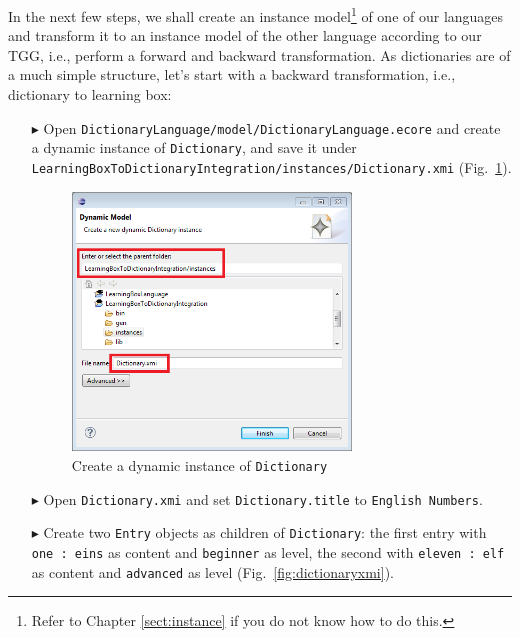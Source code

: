In the next few steps, we shall create an instance model\footnote{Refer to Chapter \ref{sect:instance} if you do not know how to do this.} of one of our languages and  transform it to an instance model of the other language according to our TGG, i.e., perform a forward and backward transformation.
As dictionaries are of a much simple structure, let's start with a backward transformation, i.e., dictionary to learning box:

\begin{enumerate}
\item[$\blacktriangleright$] Open \texttt{Dictionary\-Language/model/Dictionary\-Language.ecore} and create a dynamic instance of \texttt{Dictionary}, and save it under \texttt{Learn\-ing\-Box\-To\-Dictionary\-In\-te\-gra\-tion/in\-stan\-ces/Dic\-tion\-ary.xmi} (Fig.~\ref{fig:create_instance_dict}).

\begin{figure}[htbp]
\begin{center}
  \includegraphics[width=0.7\textwidth]{pics/tggBilder/transformation/tgg24}
  \caption{Create a dynamic instance of \texttt{Dictionary}}  
  \label{fig:create_instance_dict}
\end{center}
\end{figure} 

\item[$\blacktriangleright$] Open \texttt{Dictionary.xmi} and set \texttt{Dictionary.title} to \texttt{English Numbers}. 
\item[$\blacktriangleright$] Create two \texttt{Entry} objects as children of \texttt{Dictionary}: the first entry with \texttt{one : eins} as content and \texttt{beginner} as level, the second with \texttt{eleven : elf} as content and \texttt{advanced} as level (Fig.~\ref{fig:dictionaryxmi}).


\end{enumerate}
